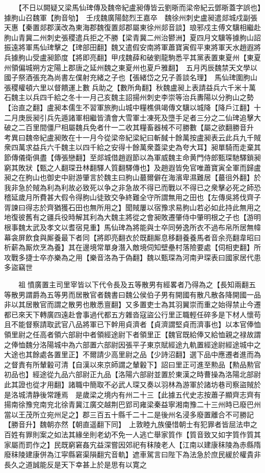 　　【不日以闕疑又梁馬仙琕傳及魏帝紀盧昶傳皆云劉晣而梁帝紀云鄧晣蓋字誤也】據朐山召魏軍【朐音劬】　壬戌魏廣陽懿烈王嘉卒　魏徐州刺史盧昶遣郯城戍副張天惠【秦置郯郡漢改為東海郡魏復置郯郡屬東徐州郯音談】琅邪戍主傅文驥相繼赴朐山青冀二州刺史張稷遣兵拒之不勝【梁青冀二州治鬰洲】夏四月文驥等據朐山詔振遠將軍馬仙琕擊之【琕部田翻】魏又遣假安南將軍蕭寶寅假平東將軍天水趙遐將兵據朐山受盧昶節度【將即亮翻】甲戌魏薛和破劉龍駒悉平其黨表置東夏州【東夏州領偏城朔方定陽上郡唐之延州魏之東夏州也夏戶雅翻】　五月丙辰魏禁天文學以國子祭酒張充為尚書左僕射充緒之子也【張緒岱之兄子善談名理】　馬仙琕圍朐山張稷權頓六里以督饋運上數兵助之【數所角翻】秋魏盧昶上表請益兵六千米十萬石魏主以兵四千給之冬十一月己亥魏主詔揚州刺史李崇等治兵夀陽以分朐山之勢【治直之翻】盧昶本儒生不習軍旅朐山城中糧樵俱竭傳文驥以城降【降戶江翻】十二月庚辰昶引兵先遁諸軍相繼皆潰會大雪軍士凍死及墮手足者三分之二仙琕追擊大破之二百里間僵尸相屬魏兵免者什一二收其糧畜器械不可勝數【屬之欲翻勝音升　考異曰魏帝紀盧昶敗在十一月今從梁帝紀梁紀曰斬馘十餘萬按盧昶表云此兵九千賊衆四萬求益兵六千魏主以四千給之安得十餘萬衆蓋梁史為夸大耳】昶單騎而走棄其節傳儀衛俱盡【傳張戀翻】至郯城借趙遐節以為軍威魏主命黄門侍郎甄琛馳驛鎖昶窮其敗狀【甄之人翻琛丑林翻驛人質翻驛傳也】及趙遐皆免官唯蕭寶寅全軍而歸盧昶之在朐山也御史中尉游肇言於魏主曰朐山蕞爾僻在海濱卑濕難居【蕞徂外翻】於我非急於賊為利為利故必致死以争之非急故不得已而戰以不得已之衆擊必死之師恐稽延歲月所費甚大假令得朐山徒致交争終難全守所謂無用之田也【左傳吳將伐齊子胥諫曰得志於齊猶獲石田也無所用之】聞賊屢以宿豫求易朐山若必如此持此無用之地復彼舊有之疆兵役時解其利為大魏主將從之會昶敗遷肇侍中肇明根之子也【游明根事魏太武及孝文以耆宿見重】馬仙琕為將能與士卒同勞逸所衣不過布帛所居無幃幕衾屏飲食與厮養最下者同【將即亮翻衣於既翻厮息移翻養養馬者音余亮翻韋昭曰析薪為厮炊烹為養】其在邊境常單身潛入敵境伺知壁壘村落險要處【伺相吏翻】所攻戰多捷士卒亦樂為之用【樂音洛為于偽翻】魏以甄琛為河南尹琛表曰國家居代患多盜竊世

　　祖憤廣置主司里宰皆以下代令長及五等散男有經畧者乃得為之【長知兩翻五等散男謂爵為五等男而居散官者魏書曰魏公侯伯子男有開國有散凡散各降開國一品非以其居散官而謂之散男也散悉亶翻】又多置吏士為其羽翼崇而重之始得禁止今遷都已來天下轉廣四遠赴會事過代都五方雜沓寇盜公行里正職輕任碎多是下材人懷苟且不能督察請取武官八品將軍已下幹用貞濟者【貞濟謂堅貞而濟事也】以本官俸恤領里尉之任高者領六部尉中者領經途尉下者領里正【魏官既給俸又給恤親之禄故謂之俸恤魏分洛陽城中為六部置六部尉因張平子東京賦經途九軌置經途尉經途城中之大途也其餘處各置里正】不爾請少高里尉之品【少詩沼翻】選下品中應遷者進而為之督責有所輦轂可清【自漢以來京師謂之輦轂下】詔曰里正可進至勲品【勲品勲官初品也】經途從九品六部尉正九品【洛陽六部尉並置於東漢之時曹操為洛陽北部尉此其證也從才用翻】諸職中簡取不必武人琛又奏以羽林為游軍於諸坊巷司察盜賊於是洛城清静後常踵焉　是歲梁之境内有州二十三【此據五代史志按蕭子顯齊志齊有揚南徐豫兖南兖北徐青冀江廣交越荆巴郢司雍梁秦益寧湘南豫二十三州時已廢巴州當以王茂所立宛州足之】郡三百五十縣千二十二是後州名浸多廢置離合不可勝記【勝音升】魏朝亦然【朝直遥翻下同】　上敦睦九族優惜朝士有犯罪者皆屈法申之百姓有罪則案之如法其緣坐則老幼不免一人逃亡舉家質作【質音致又如字質作質其家屬而罰作之】民既窮窘姦宄益深嘗因郊祀有秣陵老人【江南以建康秣陵為赤縣隋廢秣陵建康併為江寜縣窘渠隕翻宄音軌】遮車駕言曰陛下為法急於庶民緩於權貴非長久之道誠能反是天下幸甚上於是思有以寛之

